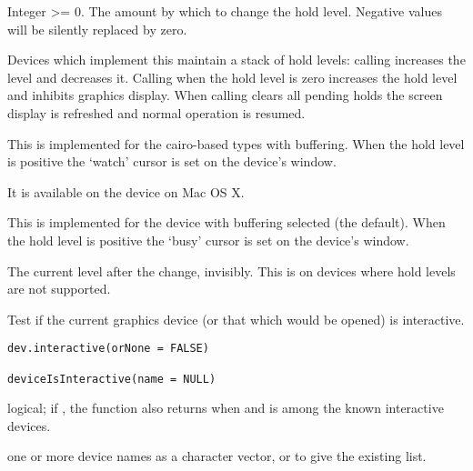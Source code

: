 %
\begin{Arguments}
\begin{ldescription}
\item[\code{level}] Integer >= 0.  The amount by which to change the hold
level.  Negative values will be silently replaced by zero.
\end{ldescription}
\end{Arguments}
%
\begin{Details}\relax
Devices which implement this maintain a stack of hold levels: calling
 increases the level and  decreases it.
Calling  when the hold level is zero increases the hold
level and inhibits graphics display.  When calling 
clears all pending holds the screen display is refreshed and normal
operation is resumed.

This is implemented for the cairo-based  types
with buffering.  When the hold level is positive the `watch'
cursor is set on the device's window.

It is available on the  device on Mac OS X.

This is implemented for the  device with
buffering selected (the default).  When the hold level is positive the
`busy' cursor is set on the device's window.
\end{Details}
%
\begin{Value}
The current level after the change, invisibly.  This is  on
devices where hold levels are not supported.
\end{Value}
%
\begin{Description}\relax
Test if the current graphics device (or that which would be opened) is
interactive.
\end{Description}
%
\begin{Usage}
\begin{verbatim}
dev.interactive(orNone = FALSE)

deviceIsInteractive(name = NULL)
\end{verbatim}
\end{Usage}
%
\begin{Arguments}
\begin{ldescription}
\item[\code{orNone}] logical; if , the function also returns
 when  and
 is among the known
interactive devices.
\item[\code{name}] one or more device names as a character vector,
or  to give the existing list.
\end{ldescription}
\end{Arguments}
